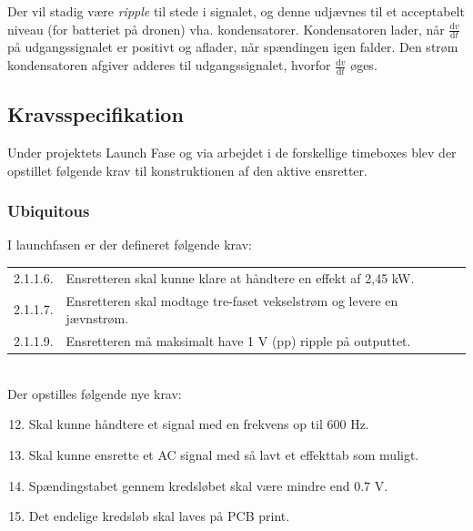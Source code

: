 Der vil stadig være \textit{ripple} til stede i signalet, og denne udjævnes til et acceptabelt niveau (for batteriet på dronen) vha. kondensatorer. Kondensatoren lader, når $\frac{\mathrm{d}v}{\mathrm{d}t}$ på udgangssignalet er positivt og aflader, når spændingen igen falder. Den strøm kondensatoren afgiver adderes til udgangssignalet, hvorfor $\frac{\mathrm{d}v}{\mathrm{d}t}$ øges.

\subsection{Kravsspecifikation}
\label{sec:kravsspecifikation-4}

Under projektets Launch Fase og via arbejdet i de forskellige timeboxes blev der opstillet følgende krav til konstruktionen af den aktive ensretter.

\subsubsection{Ubiquitous}
\label{sec:ubiquitous}

I launchfasen er der defineret følgende krav:\\

\vspace{1em}
\begin{tabular}[h]{ll}
  2.1.1.6. &Ensretteren skal kunne klare at håndtere en effekt af 2,45 kW.\vspace{0.5em}\\
  2.1.1.7. &Ensretteren skal modtage tre-faset vekselstrøm og levere en jævnstrøm.\vspace{0.5em}\\%
  2.1.1.9. &Ensretteren må maksimalt have 1 V (pp) ripple på outputtet.\vspace{0.5em}\\
\end{tabular}
\vspace{1em}\\

Der opstilles følgende nye krav:
\begin{enumerate}[label=2.1.1.\arabic*]
  \setcounter{enumi}{11}
\item Skal kunne håndtere et signal med en frekvens op til 600 Hz.
\item Skal kunne ensrette et AC signal med så lavt et effekttab som muligt.
\item Spændingstabet gennem kredsløbet skal være mindre end 0.7 V.
\item Det endelige kredsløb skal laves på PCB print.
\end{enumerate}


